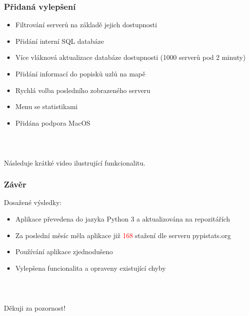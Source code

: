 \documentclass[%
  12pt,       				%
	t,                  %
	aspectratio=1610,   %
	unicode,						%
]{beamer}				    	%
\begin{document}
\begin{frame} 
\frametitle{Přidaná vylepšení}
\begin{itemize}
	\item Filtrování serverů na základě jejich dostupnosti
	\item Přidání interní SQL databáze
	\item Více vláknová aktualizace databáze dostupnosti (1000 serverů pod 2 minuty)
	\item Přidání informací do popisků uzlů na mapě
	\item Rychlá volba posledního zobrazeného serveru
	\item Menu se statistikami
	\item Přidána podpora MacOS
\end{itemize}
\end{frame}

\begin{frame}[c] 
\frametitle{\mbox{ }}
\begin{center}
	{\Huge Následuje krátké video ilustrující funkcionalitu.}
\end{center}
\end{frame}


\begin{frame} 
	\frametitle{Závěr}
	Dosažené výsledky:
	\begin{itemize}
		\item Aplikace převedena do jazyka Python 3 a aktualizována na repozitářích
		\item Za poslední měsíc měla aplikace již \textcolor{red}{168} stažení dle serveru pypistats.org
		\item Používání aplikace zjednodušeno
		\item Vylepšena funcionalita a opraveny existující chyby
	\end{itemize}
\begin{figure}[H]
	\centering
\end{figure}
\end{frame}


\begin{frame}[c] 
	\frametitle{\mbox{ }}
	\begin{center}
		{\Huge Děkuji za pozornost!}
	\end{center}
\end{frame}
\end{document}
